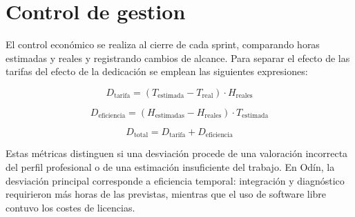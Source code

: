 \section{Control de gestion}
El control económico se realiza al cierre de cada sprint, comparando horas estimadas y reales y registrando cambios de alcance. Para separar el efecto de las tarifas del efecto de la dedicación se emplean las siguientes expresiones:

\[
D_{\mathrm{tarifa}} =
\left(T_{\mathrm{estimada}} - T_{\mathrm{real}}\right)
\cdot H_{\mathrm{reales}}
\]

\[
D_{\mathrm{eficiencia}} =
\left(H_{\mathrm{estimadas}} - H_{\mathrm{reales}}\right)
\cdot T_{\mathrm{estimada}}
\]

\[
D_{\mathrm{total}} =
D_{\mathrm{tarifa}} + D_{\mathrm{eficiencia}}
\]

Estas métricas distinguen si una desviación procede de una valoración incorrecta del perfil profesional o de una estimación insuficiente del trabajo. En Odín, la desviación principal corresponde a eficiencia temporal: integración y diagnóstico requirieron más horas de las previstas, mientras que el uso de software libre contuvo los costes de licencias.

